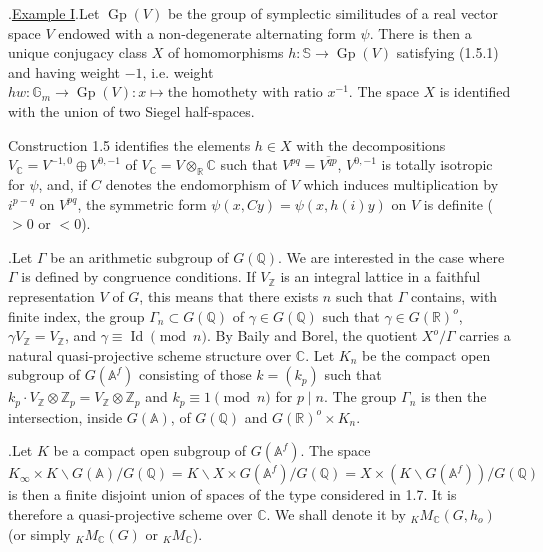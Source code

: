 \documentclass[10pt]{article}
\newcommand{\A}{\mathbb A}
\newcommand{\Af}{\mathbb A^f}
\newcommand{\C}{\mathbb C}
\newcommand{\Gm}{\mathbb G_m}
\newcommand{\Q}{\mathbb Q}
\newcommand{\R}{\mathbb R}
\newcommand{\Z}{\mathbb Z}
\newcommand{\bS}{\mathbb S}
\newcommand{\Gp}{\operatorname{Gp}}
\newcommand{\id}{\operatorname{Id}}
\newcommand{\MC}{M_{\C}}
\begin{document}
.\quad \uline{Example I}.\quad Let $\Gp(V)$ be the group of symplectic similitudes of a real vector space $V$ endowed with a non-degenerate alternating form $\psi$. There is then a unique conjugacy class $X$ of homomorphisms $h:\bS\to\Gp(V)$ satisfying (1.5.1) and having weight $-1$, i.e. weight $hw:\Gm\to\Gp(V):x\longmapsto\text{the homothety with ratio }x^{-1}$. The space $X$ is identified with the union of two Siegel half-spaces.

Construction 1.5 identifies the elements $h\in X$ with the decompositions $V_\C=V^{-1,0}\oplus V^{0,-1}$ of $V_\C=V\otimes_\R\C$ such that $V^{pq}=\overline{V^{qp}}$, $V^{0,-1}$ is totally isotropic for $\psi$, and, if $C$ denotes the endomorphism of $V$ which induces multiplication by $i^{p-q}$ on $V^{pq}$, the symmetric form $\psi(x,Cy)=\psi(x,h(i)y)$ on $V$ is definite ($>0$ or $<0$).

.\quad Let $\Gamma$ be an arithmetic subgroup of $G(\Q)$. We are interested in the case where $\Gamma$ is defined by congruence conditions. If $V_\Z$ is an integral lattice in a faithful representation $V$ of $G$, this means that there exists $n$ such that $\Gamma$ contains, with finite index, the group $\Gamma_n\subset G(\Q)$ of $\gamma\in G(\Q)$ such that $\gamma\in G(\R)^o$,
$\gamma V_\Z=V_\Z$, and $\gamma\equiv\id\pmod n$. By Baily and Borel, the quotient $X^o/\Gamma$ carries a natural quasi-projective scheme structure over $\C$. Let $K_n$ be the compact open subgroup of $G(\Af)$ consisting of those $k=(k_p)$ such that $k_p\cdot V_\Z\otimes\Z_p=V_\Z\otimes\Z_p$ and $k_p\equiv1\pmod n$ for $p\mid n$. The group $\Gamma_n$ is then the intersection, inside $G(\A)$, of $G(\Q)$ and $G(\R)^o\times K_n$.

.\quad Let $K$ be a compact open subgroup of $G(\Af)$. The space $K_\infty\times K\backslash G(\A)/G(\Q)=K\backslash X\times G(\Af)/G(\Q)=X\times(K\backslash G(\Af))/G(\Q)$ is then a finite disjoint union of spaces of the type considered in 1.7. It is therefore a quasi-projective scheme over $\C$. We shall denote it by ${}_K\MC(G,h_o)$ (or simply ${}_K\MC(G)$ or ${}_K\MC$).
\end{document}

